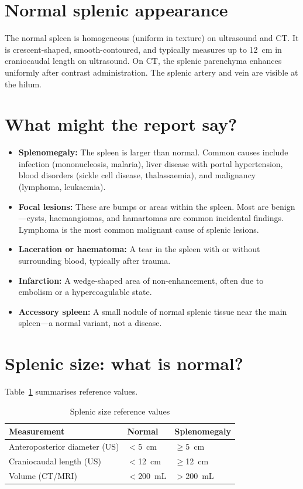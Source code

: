 \section{Normal splenic appearance}
The normal spleen is homogeneous (uniform in texture) on ultrasound and CT. It is crescent-shaped, smooth-contoured, and typically measures up to 12~cm in craniocaudal length on ultrasound. On CT, the splenic parenchyma enhances uniformly after contrast administration. The splenic artery and vein are visible at the hilum.

\section{What might the report say?}
\begin{itemize}
    \item \textbf{Splenomegaly:} The spleen is larger than normal. Common causes include infection (mononucleosis, malaria), liver disease with portal hypertension, blood disorders (sickle cell disease, thalassaemia), and malignancy (lymphoma, leukaemia).
    \item \textbf{Focal lesions:} These are bumps or areas within the spleen. Most are benign---cysts, haemangiomas, and hamartomas are common incidental findings. Lymphoma is the most common malignant cause of splenic lesions.
    \item \textbf{Laceration or haematoma:} A tear in the spleen with or without surrounding blood, typically after trauma.
    \item \textbf{Infarction:} A wedge-shaped area of non-enhancement, often due to embolism or a hypercoagulable state.
    \item \textbf{Accessory spleen:} A small nodule of normal splenic tissue near the main spleen---a normal variant, not a disease.
\end{itemize}

\section{Splenic size: what is normal?}
Table~\ref{tab:spleen_size} summarises reference values.

\begin{table}[h]
\centering
\caption{Splenic size reference values}
\label{tab:spleen_size}
\begin{tabular}{lll}
\hline
\textbf{Measurement} & \textbf{Normal} & \textbf{Splenomegaly} \\
\hline
Anteroposterior diameter (US) & $<$5~cm & $\geq$5~cm \\
Craniocaudal length (US) & $<$12~cm & $\geq$12~cm \\
Volume (CT/MRI) & $<$200~mL & $>$200~mL \\
\hline
\end{tabular}
\end{table}

